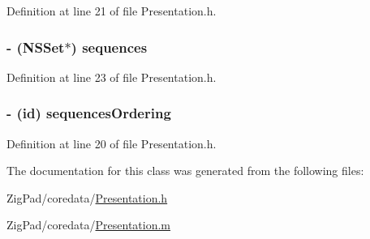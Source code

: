 Definition at line 21 of file Presentation.h.

\hypertarget{interface_presentation_a4cb3c561b838983ae43c00bf45aa2059}{
\subsubsection[{sequences}]{\setlength{\rightskip}{0pt plus 5cm}-\/ (NSSet$\ast$) sequences}}
\label{interface_presentation_a4cb3c561b838983ae43c00bf45aa2059}


Definition at line 23 of file Presentation.h.

\hypertarget{interface_presentation_a818c2c185bddd9433ff9ea8fcdd218a0}{
\subsubsection[{sequencesOrdering}]{\setlength{\rightskip}{0pt plus 5cm}-\/ (id) sequencesOrdering}}
\label{interface_presentation_a818c2c185bddd9433ff9ea8fcdd218a0}


Definition at line 20 of file Presentation.h.



The documentation for this class was generated from the following files:\begin{DoxyCompactItemize}
\item 
ZigPad/coredata/\hyperlink{_presentation_8h}{Presentation.h}\item 
ZigPad/coredata/\hyperlink{_presentation_8m}{Presentation.m}\end{DoxyCompactItemize}
